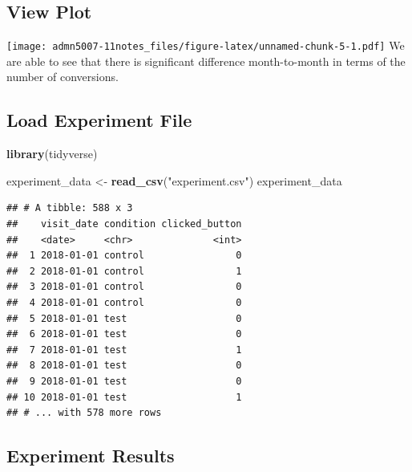 \documentclass[]{article}
\newenvironment{Shaded}{\begin{snugshade}}{\end{snugshade}}
\newcommand{\KeywordTok}[1]{\textcolor[rgb]{0.13,0.29,0.53}{\textbf{#1}}}
\newcommand{\DataTypeTok}[1]{\textcolor[rgb]{0.13,0.29,0.53}{#1}}
\newcommand{\StringTok}[1]{\textcolor[rgb]{0.31,0.60,0.02}{#1}}
\newcommand{\OperatorTok}[1]{\textcolor[rgb]{0.81,0.36,0.00}{\textbf{#1}}}
\newcommand{\NormalTok}[1]{#1}
\begin{document}
\subsection{View Plot}\label{view-plot}

\texttt{[image: admn5007-11notes\_files/figure-latex/unnamed-chunk-5-1.pdf]}
We are able to see that there is significant difference month-to-month
in terms of the number of conversions.

\subsection{Load Experiment File}\label{load-experiment-file}

\begin{Shaded}
\begin{Highlighting}[]
\KeywordTok{library}\NormalTok{(tidyverse)}

\NormalTok{experiment_data <-}\StringTok{ }\KeywordTok{read_csv}\NormalTok{(}\StringTok{"experiment.csv"}\NormalTok{)}
\NormalTok{experiment_data}
\end{Highlighting}
\end{Shaded}

\begin{verbatim}
## # A tibble: 588 x 3
##    visit_date condition clicked_button
##    <date>     <chr>              <int>
##  1 2018-01-01 control                0
##  2 2018-01-01 control                1
##  3 2018-01-01 control                0
##  4 2018-01-01 control                0
##  5 2018-01-01 test                   0
##  6 2018-01-01 test                   0
##  7 2018-01-01 test                   1
##  8 2018-01-01 test                   0
##  9 2018-01-01 test                   0
## 10 2018-01-01 test                   1
## # ... with 578 more rows
\end{verbatim}

\subsection{Experiment Results}\label{experiment-results}

\begin{Shaded}
\end{Shaded}
\end{document}
